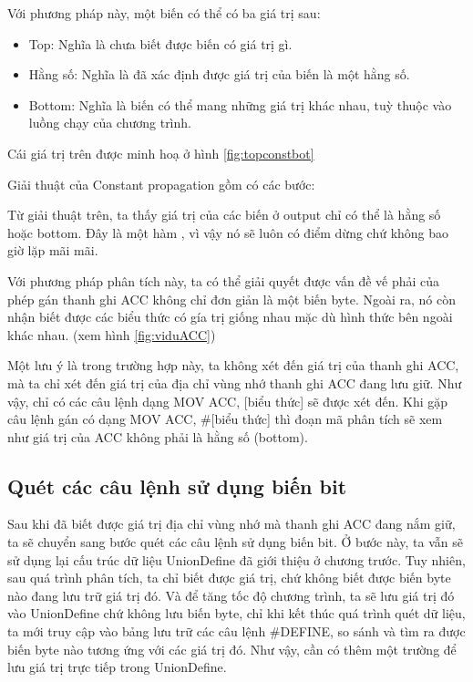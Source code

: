 Với phương pháp này, một biến có thể có ba giá trị sau:
\begin{itemize}
	\item Top: Nghĩa là chưa biết được biến có giá trị gì.
	\item Hằng số: Nghĩa là đã xác định được giá trị của biến là một hằng số.
	\item Bottom: Nghĩa là biến có thể mang những giá trị khác nhau, tuỳ thuộc vào luồng chạy của chương trình.
\end{itemize}
Cái giá trị trên được minh hoạ ở hình \ref{fig:topconstbot}

Giải thuật của Constant propagation gồm có các bước:

Từ giải thuật trên, ta thấy giá trị của các biến ở output chỉ có thể là hằng số hoặc bottom. Đây là một hàm %
, vì vậy nó sẽ luôn có điểm dừng chứ không bao giờ lặp mãi mãi.

Với phương pháp phân tích này, ta có thể giải quyết được vấn đề vế phải của phép gán thanh ghi ACC không chỉ đơn giản là một biến byte. Ngoài ra, nó còn nhận biết được các biểu thức có gía trị giống nhau mặc dù hình thức bên ngoài khác nhau. (xem hình \ref{fig:viduACC})


Một lưu ý là trong trường hợp này, ta không xét đến giá trị của thanh ghi ACC, mà ta chỉ xét đến giá trị của địa chỉ vùng nhớ thanh ghi ACC đang lưu giữ. Như vậy, chỉ có các câu lệnh dạng MOV ACC, [biểu thức] sẽ được xét đến. Khi gặp câu lệnh gán có dạng MOV ACC, \#[biểu thức] thì đoạn mã phân tích sẽ xem như giá trị của ACC không phải là hằng số (bottom).
\subsection{Quét các câu lệnh sử dụng biến bit}

Sau khi đã biết được giá trị địa chỉ vùng nhớ mà thanh ghi ACC đang nắm giữ, ta sẽ chuyển sang bước quét các câu lệnh sử dụng biến bit. Ở bước này, ta vẫn sẽ sử dụng lại cấu trúc dữ liệu UnionDefine đã giới thiệu ở chương trước. Tuy nhiên, sau quá trình phân tích, ta chỉ biết được giá trị, chứ không biết được biến byte nào đang lưu trữ giá trị đó. Và để tăng tốc độ chương trình, ta sẽ lưu giá trị đó vào UnionDefine chứ không lưu biến byte, chỉ khi kết thúc quá trình quét dữ liệu, ta mới truy cập vào bảng lưu trữ các câu lệnh \#DEFINE, so sánh và tìm ra được biến byte nào tương ứng với các giá trị đó. Như vậy, cần có thêm một trường để lưu giá trị trực tiếp trong UnionDefine.

